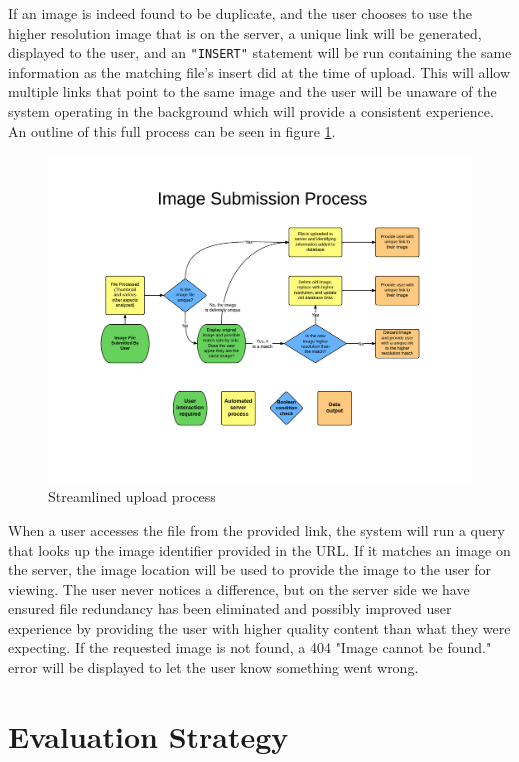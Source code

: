 \documentclass[11pt]{article}
\begin{document}
If an image is indeed found to be duplicate, and the user chooses to use the higher resolution image that is on the server, a unique link will be generated, displayed to the user, and an {\tt "INSERT"} statement will be run containing the same information as the matching file's insert did at the time of upload. This will allow multiple links that point to the same image and the user will be unaware of the system operating in the background which will provide a consistent experience. An outline of this full process can be seen in figure \ref{method-fig1}.

\begin{figure}[htbp]
\centering
\includegraphics[trim={3cm 3.5cm 2cm 4.2cm},clip, width=6in]{upproc}
\caption{Streamlined upload process}
\label{method-fig1}
\end{figure}

When a user accesses the file from the provided link, the system will run a query that looks up the image identifier provided in the URL. If it matches an image on the server, the image location will be used to provide the image to the user for viewing. The user never notices a difference, but on the server side we have ensured file redundancy has been eliminated and possibly improved user experience by providing the user with higher quality content than what they were expecting. If the requested image is not found, a 404 "Image cannot be found." error will be displayed to let the user know something went wrong.

\vspace*{-.2in}
\section{Evaluation Strategy}
\label{sec:evaluate}
\vspace*{-.1in}
\end{document}
